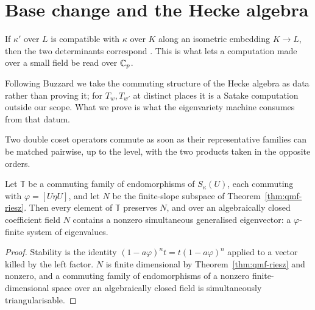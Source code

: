 \section{Base change and the Hecke algebra}

\begin{proposition}
  \label{prop:qmf-basechange}
  \leanok
  If $\kappa'$ over $L$ is compatible with $\kappa$ over $K$ along an isometric embedding $K \to
  L$, then the two determinants correspond \cite[Lemma 2.13]{Buzzard}.  This is what lets a
  computation made over a small field be read over $\mathbb{C}_p$.
\end{proposition}

Following Buzzard \cite[\S5]{Buzzard} we take the commuting structure of the Hecke algebra as
data rather than proving it; for $T_w, T_{w'}$ at distinct places it is a Satake computation
outside our scope.  What we prove is what the eigenvariety machine consumes from that datum.

\begin{proposition}
  \label{prop:hecke-comm-criterion}
  \leanok
  Two double coset operators commute as soon as their representative families can be matched
  pairwise, up to the level, with the two products taken in the opposite orders.
\end{proposition}


\begin{proposition}
  \label{prop:qmf-eigensystem}
  \leanok
  Let $\mathbb{T}$ be a commuting family of endomorphisms of $S_\kappa(U)$, each commuting with $\varphi
  = [U\eta U]$, and let $N$ be the finite-slope subspace of Theorem~\ref{thm:qmf-riesz}.  Then
  every element of $\mathbb{T}$ preserves $N$, and over an algebraically closed coefficient field $N$
  contains a nonzero simultaneous generalised eigenvector: a $\varphi$-finite system of
  eigenvalues.
\end{proposition}

\begin{proof}
  \leanok
  Stability is the identity $(1-a\varphi)^n t = t (1-a\varphi)^n$ applied to a vector killed by
  the left factor.  $N$ is finite dimensional by Theorem~\ref{thm:qmf-riesz} and nonzero, and a
  commuting family of endomorphisms of a nonzero finite-dimensional space over an algebraically
  closed field is simultaneously triangularisable.
\end{proof}
